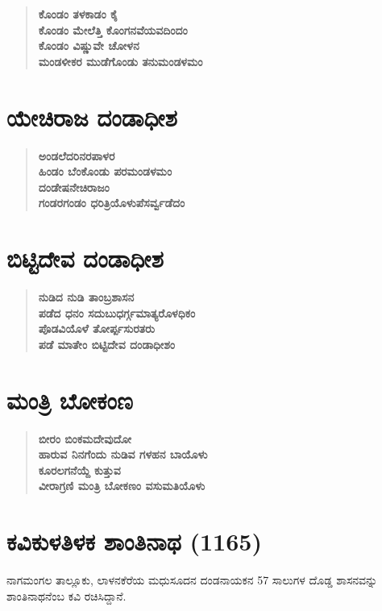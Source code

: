 \begin{verse}
\textbf{ಕೊಂಡಂ ತಳಕಾಡಂ ಕೈ} \\\textbf{ಕೊಂಡಂ ಮೇಲೆತ್ತಿ ಕೊಂಗನವೆಯವದಿಂದಂ} \\\textbf{ಕೊಂಡಂ ವಿಷ್ಣುವೇ ಚೋಳನ} \\\textbf{ಮಂಡಳೀಕರ ಮುಡೆಗೊಂಡು ತನುಮಂಡಳಮಂ}
\end{verse}


\section{ಯೇಚಿರಾಜ ದಂಡಾಧೀಶ}

\begin{verse}
\textbf{ಅಂಡಲೆದರಿನರಪಾಳರ} \\\textbf{ಹಿಂಡಂ ಬೆಂಕೊಂಡು ಪರಮಂಡಳಮಂ} \\\textbf{ದಂಡೇಷನೇಚಿರಾಜಂ} \\\textbf{ಗಂಡರಗಂಡಂ ಧರಿತ್ರಿಯೊಳುಪೆಸರ್ವ್ವಡೆದಂ}
\end{verse}


\section{ಬಿಟ್ಟಿದೇವ ದಂಡಾಧೀಶ}

\begin{verse}
\textbf{ನುಡಿದ ನುಡಿ ತಾಂಬ್ರಶಾಸನ} \\\textbf{ಪಡೆದ ಧನಂ ಸದುಬುಧರ್ಗ್ಗಮಾತ್ಯರೊಳಧಿಕಂ} \\\textbf{ಪೊಡವಿಯೊಳೆ ತೋರ್ಪ್ಪಸುರತರು} \\\textbf{ಪಡೆ ಮಾತೇಂ ಬಿಟ್ಟಿದೇವ ದಂಡಾಧೀಶಂ}
\end{verse}


\section{ಮಂತ್ರಿ ಬೋಕಂಣ}

\begin{verse}
\textbf{ಬೀರಂ ಬಿಂಕಮದೇವುದೋ} \\\textbf{ಹಾರುವ ನಿನಗೆಂದು ನುಡಿವ ಗಳಹನ ಬಾಯೊಳು} \\\textbf{ಕೂರಲಗನೆಯ್ದೆ ಕುತ್ತುವ} \\\textbf{ವೀರಾಗ್ರಣಿ ಮಂತ್ರಿ ಬೋಕಣಂ ವಸುಮತಿಯೊಳು}
\end{verse}


\section{ಕವಿಕುಳತಿಳಕ ಶಾಂತಿನಾಥ (1165)}

ನಾಗಮಂಗಲ ತಾಲ್ಲೂಕು, ಲಾಳನಕೆರೆಯ ಮಧುಸೂದನ ದಂಡನಾಯಕನ 57 ಸಾಲುಗಳ ದೊಡ್ಡ ಶಾಸನವನ್ನು ಶಾಂತಿನಾಥನೆಂಬ ಕವಿ ರಚಿಸಿದ್ದಾನೆ.

